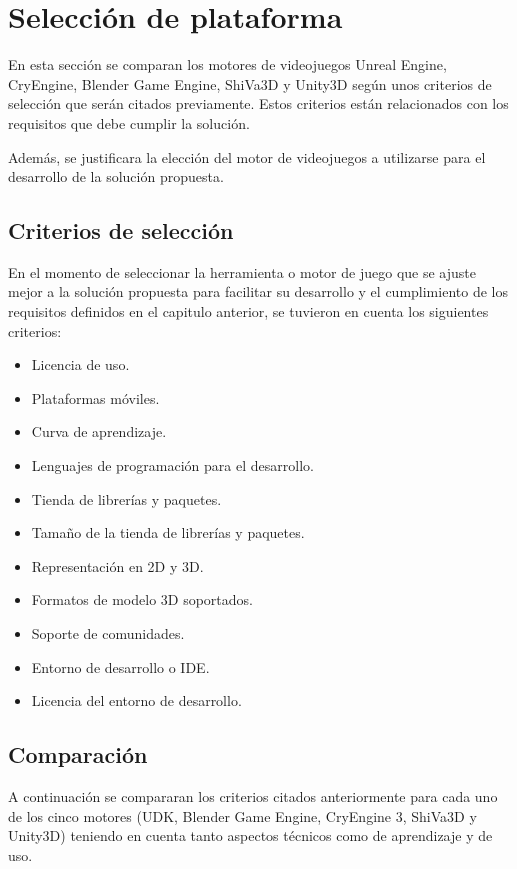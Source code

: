 \section{Selección de plataforma}

En esta sección se comparan los motores de videojuegos Unreal Engine, CryEngine, Blender Game Engine, ShiVa3D y Unity3D según unos criterios de selección que serán citados previamente. Estos criterios están relacionados
con los requisitos que debe cumplir la solución.

Además, se justificara la elección del motor de videojuegos a utilizarse para el desarrollo de la solución propuesta.

\subsection{Criterios de selección}

En el momento de seleccionar la herramienta o motor de juego que se ajuste mejor
a la solución propuesta para facilitar su desarrollo y el cumplimiento de los
requisitos definidos en el capitulo anterior, se tuvieron en cuenta los
siguientes criterios:

\begin{itemize}
\item Licencia de uso.
\item Plataformas móviles.
\item Curva de aprendizaje.
\item Lenguajes de programación para el desarrollo.
\item Tienda de librerías y paquetes.
\item Tamaño de la tienda de librerías y paquetes.
\item Representación en 2D y 3D.
\item Formatos de modelo 3D soportados.
\item Soporte de comunidades.
\item Entorno de desarrollo o IDE.
\item Licencia del entorno de desarrollo.
\end{itemize}


\subsection{Comparación}

A continuación se compararan los criterios citados anteriormente para cada uno de los
cinco motores (UDK, Blender Game Engine, CryEngine 3, ShiVa3D y Unity3D) teniendo en cuenta tanto
aspectos técnicos como de aprendizaje y de uso.

